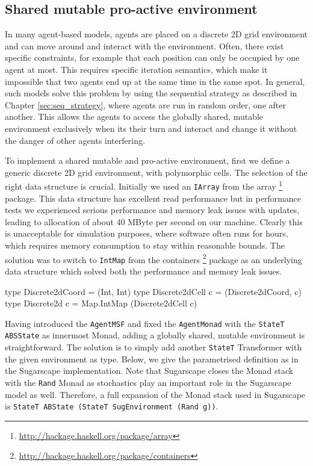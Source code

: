 \subsection{Shared mutable pro-active environment}
In many agent-based models, agents are placed on a discrete 2D grid environment and can move around and interact with the environment. Often, there exist specific constraints, for example that each position can only be occupied by one agent at most. This requires specific iteration semantics, which make it impossible that two agents end up at the same time in the same spot. In general, such models solve this problem by using the sequential strategy as described in Chapter \ref{sec:seq_strategy}, where agents are run in random order, one after another. This allows the agents to access the globally shared, mutable environment exclusively when its their turn and interact and change it without the danger of other agents interfering.

To implement a shared mutable and pro-active environment, first we define a generic discrete 2D grid environment, with polymorphic cells. The selection of the right data structure is crucial. Initially we used an \texttt{IArray} from the array \footnote{\url{http://hackage.haskell.org/package/array}} package. This data structure has excellent read performance but in performance tests we experienced serious performance and memory leak issues with updates, leading to allocation of about 40 MByte per second on our machine. Clearly this is unacceptable for simulation purposes, where software often runs for hours, which requires memory consumption to stay within reasonable bounds. The solution was to switch to \texttt{IntMap} from the containers \footnote{\url{http://hackage.haskell.org/package/containers}} package as an underlying data structure which solved both the performance and memory leak issues.

\begin{HaskellCode}
type Discrete2dCoord  = (Int, Int)
type Discrete2dCell c = (Discrete2dCoord, c)
type Discrete2d c     = Map.IntMap (Discrete2dCell c)
\end{HaskellCode}

Having introduced the \texttt{AgentMSF} and fixed the \texttt{AgentMonad} with the \texttt{StateT ABSState} as innermost Monad, adding a globally shared, mutable environment is straightforward. The solution is to simply add another \texttt{StateT} Transformer with the given environment as type. Below, we give the parametrised definition as in the Sugarscape implementation. Note that Sugarscape closes the Monad stack with the \texttt{Rand} Monad as stochastics play an important role in the Sugarscape model as well. Therefore, a full expansion of the Monad stack used in Sugarscape is \texttt{StateT ABState (StateT SugEnvironment (Rand g))}.

